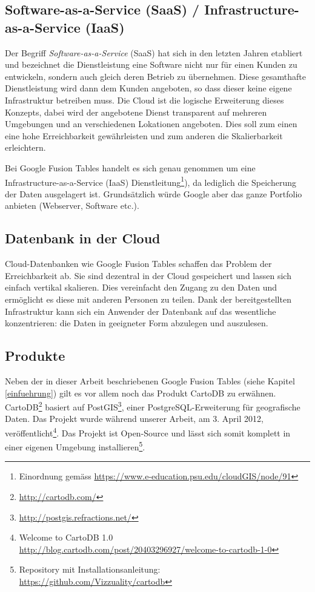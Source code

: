 \subsection{Software-as-a-Service (SaaS) / Infrastructure-as-a-Service (IaaS)}
Der Begriff \emph{Software-as-a-Service} (\gls{SaaS}) hat sich in den letzten Jahren etabliert und bezeichnet die Dienstleistung eine Software nicht nur für einen Kunden zu entwickeln, sondern auch gleich deren Betrieb zu übernehmen. Diese gesamthafte Dienstleistung wird dann dem Kunden angeboten, so dass dieser keine eigene Infrastruktur betreiben muss. Die \gls{Cloud} ist die logische  Erweiterung dieses Konzepts, dabei wird der angebotene Dienst transparent auf mehreren Umgebungen und an verschiedenen Lokationen angeboten. Dies soll zum einen eine hohe Erreichbarkeit gewährleisten und zum anderen die Skalierbarkeit erleichtern.\cite{cloud}

Bei Google Fusion Tables handelt es sich genau genommen um eine Infrastructure-as-a-Service (IaaS) Dienstleitung\footnote{Einordnung gemäss \url{https://www.e-education.psu.edu/cloudGIS/node/91}}), da lediglich die Speicherung der Daten ausgelagert ist. Grundsätzlich würde Google aber das ganze Portfolio anbieten (Webserver,  Software etc.).

\subsection{Datenbank in der Cloud}
\gls{Cloud}-Datenbanken wie Google Fusion Tables schaffen das Problem der Erreichbarkeit ab. Sie sind dezentral in der \gls{Cloud} gespeichert und lassen sich  einfach vertikal skalieren. Dies vereinfacht den Zugang zu den Daten und ermöglicht es diese mit anderen Personen zu teilen. Dank der bereitgestellten Infrastruktur kann sich ein Anwender der Datenbank auf das wesentliche konzentrieren: die Daten in geeigneter Form abzulegen und auszulesen.

\subsection{Produkte}
Neben der in dieser Arbeit beschriebenen Google Fusion Tables (siehe Kapitel \ref{einfuehrung}) gilt es vor allem noch das Produkt CartoDB zu erwähnen. CartoDB\footnote{\url{http://cartodb.com/}} basiert auf PostGIS\footnote{\url{http://postgis.refractions.net/}}, einer PostgreSQL-Erweiterung für geografische Daten. Das Projekt wurde während unserer Arbeit, am 3. April 2012, veröffentlicht\footnote{Welcome to CartoDB 1.0 \url{http://blog.cartodb.com/post/20403296927/welcome-to-cartodb-1-0}}. Das Projekt ist Open-Source und lässt sich somit komplett in einer eigenen Umgebung installieren\footnote{Repository mit Installationsanleitung: \url{https://github.com/Vizzuality/cartodb}}.

